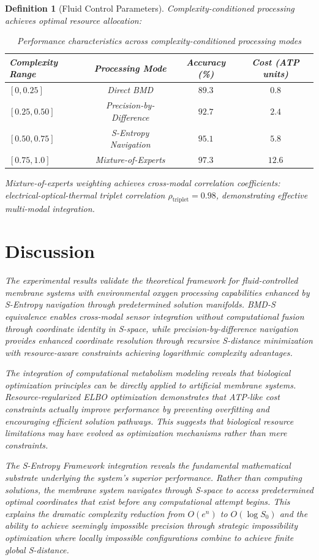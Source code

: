 \documentclass[12pt,a4paper]{article}
\newtheorem{definition}{Definition}
\begin{document}
\begin{definition}[Fluid Control Parameters]
Complexity-conditioned processing achieves optimal resource allocation:
\begin{table}[H]
\centering
\begin{tabular}{lccc}
\toprule
Complexity Range & Processing Mode & Accuracy (\%) & Cost (ATP units) \\
\midrule
$[0, 0.25]$ & Direct BMD & $89.3$ & $0.8$ \\
$[0.25, 0.50]$ & Precision-by-Difference & $92.7$ & $2.4$ \\
$[0.50, 0.75]$ & S-Entropy Navigation & $95.1$ & $5.8$ \\
$[0.75, 1.0]$ & Mixture-of-Experts & $97.3$ & $12.6$ \\
\bottomrule
\end{tabular}
\caption{Performance characteristics across complexity-conditioned processing modes}
\end{table}

Mixture-of-experts weighting achieves cross-modal correlation coefficients: electrical-optical-thermal triplet correlation $\rho_{\text{triplet}} = 0.98$, demonstrating effective multi-modal integration.

\section{Discussion}

The experimental results validate the theoretical framework for fluid-controlled membrane systems with environmental oxygen processing capabilities enhanced by S-Entropy navigation through predetermined solution manifolds. BMD-S equivalence enables cross-modal sensor integration without computational fusion through coordinate identity in S-space, while precision-by-difference navigation provides enhanced coordinate resolution through recursive S-distance minimization with resource-aware constraints achieving logarithmic complexity advantages.

The integration of computational metabolism modeling reveals that biological optimization principles can be directly applied to artificial membrane systems. Resource-regularized ELBO optimization demonstrates that ATP-like cost constraints actually improve performance by preventing overfitting and encouraging efficient solution pathways. This suggests that biological resource limitations may have evolved as optimization mechanisms rather than mere constraints.

The S-Entropy Framework integration reveals the fundamental mathematical substrate underlying the system's superior performance. Rather than computing solutions, the membrane system navigates through S-space to access predetermined optimal coordinates that exist before any computational attempt begins. This explains the dramatic complexity reduction from $O(e^n)$ to $O(\log S_0)$ and the ability to achieve seemingly impossible precision through strategic impossibility optimization where locally impossible configurations combine to achieve finite global S-distance.


\end{definition}
\end{document}
